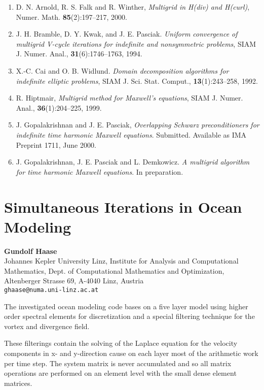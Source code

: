 \documentclass[11pt]{article}
\newcommand{\nextab}[4]{
	\section{#2}
	{\bf #1} \\ \nopagebreak
	{#3} \\ \nopagebreak
	{\tt #4} \nopagebreak
	}
\begin{document}
\begin{enumerate}

\item
D. N. Arnold, R. S. Falk and R. Winther,
{\em Multigrid in H(div) and H(curl)},
Numer. Math. {\bf 85}(2):197--217, 2000.


\item
J. H. Bramble, D. Y. Kwak, and J. E. Pasciak.
{\em Uniform convergence of multigrid V-cycle
iterations for indefinite and nonsymmetric
problems},  SIAM J. Numer. Anal.,
{\bf 31}(6):1746--1763, 1994.


\item
X.-C. Cai and O. B. Widlund.
{\em Domain decomposition algorithms for
indefinite elliptic problems},
SIAM J. Sci. Stat. Comput.,
{\bf 13}(1):243--258, 1992.


\item
R. Hiptmair,
{\em Multigrid method for Maxwell's equations},
SIAM J. Numer. Anal.,
{\bf 36}(1):204--225, 1999.

\item
J. Gopalakrishnan and J. E. Pasciak,
{\em Overlapping Schwarz preconditioners for indefinite
time harmonic Maxwell equations}.
Submitted. Available as IMA Preprint 1711, June 2000.


\item
J. Gopalakrishnan, J. E. Pasciak and L. Demkowicz.
{\em A multigrid algorithm for time harmonic
Maxwell equations}. In preparation.


\end{enumerate}




\nextab
{Gundolf Haase}
{Simultaneous Iterations in Ocean Modeling}
{Johannes Kepler University Linz,
Institute for Analysis and Computational Mathematics,
Dept. of Computational Mathematics and Optimization,
Altenberger Strasse 69,
A-4040 Linz, Austria}
{ghaase@numa.uni-linz.ac.at}


The investigated ocean modeling code bases on a
five layer model using higher order spectral elements
for discretization
and a special filtering technique
for the vortex and divergence field.

These filterings contain the solving of the Laplace equation
for the velocity components in x- and y-direction
cause on each layer most of the arithmetic work per time step.
The system matrix is never accumulated and so all
matrix operations are performed
on an element level with the small dense
element matrices.
\end{document}
